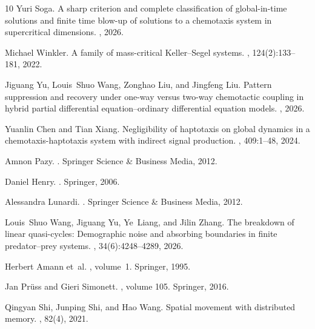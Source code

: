 \documentclass[11pt,reqno]{amsart}
\theoremstyle{definition}
\theoremstyle{remark}
\begin{document}
\begin{thebibliography}{10}
Yuri Soga.
\newblock A sharp criterion and complete classification of global-in-time solutions and finite time blow-up of solutions to a chemotaxis system in supercritical dimensions.
, 2026.

Michael Winkler.
\newblock A family of mass-critical {K}eller--{S}egel systems.
, 124(2):133--181, 2022.

Jiguang Yu, Louis~Shuo Wang, Zonghao Liu, and Jingfeng Liu.
\newblock Pattern suppression and recovery under one-way versus two-way chemotactic coupling in hybrid partial differential equation--ordinary differential equation models.
, 2026.

Yuanlin Chen and Tian Xiang.
\newblock Negligibility of haptotaxis on global dynamics in a chemotaxis-haptotaxis system with indirect signal production.
, 409:1--48, 2024.

Amnon Pazy.
.
\newblock Springer Science \& Business Media, 2012.

Daniel Henry.
.
\newblock Springer, 2006.

Alessandra Lunardi.
.
\newblock Springer Science \& Business Media, 2012.

Louis~Shuo Wang, Jiguang Yu, Ye~Liang, and Jilin Zhang.
\newblock The breakdown of linear quasi-cycles: {D}emographic noise and absorbing boundaries in finite predator--prey systems.
, 34(6):4248--4289, 2026.

Herbert Amann et~al.
, volume~1.
\newblock Springer, 1995.

Jan Pr{\"u}ss and Gieri Simonett.
, volume 105.
\newblock Springer, 2016.

Qingyan Shi, Junping Shi, and Hao Wang.
\newblock Spatial movement with distributed memory.
, 82(4), 2021.


\end{thebibliography}
\end{document}

